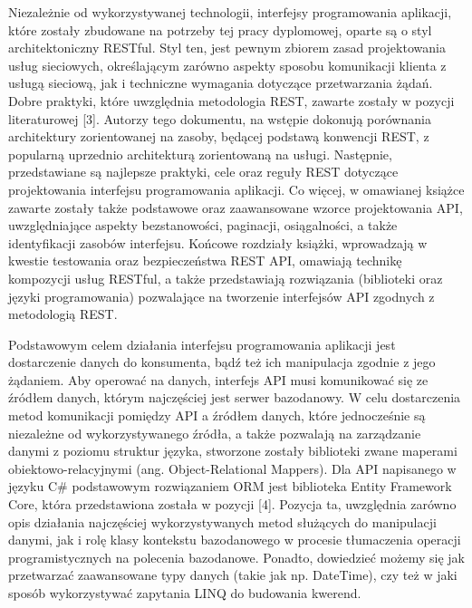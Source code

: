 Niezależnie od wykorzystywanej technologii, interfejsy programowania aplikacji, które zostały zbudowane na potrzeby tej pracy dyplomowej, oparte są o styl architektoniczny RESTful. Styl ten, jest pewnym zbiorem zasad projektowania usług sieciowych, określającym zarówno aspekty sposobu komunikacji klienta z usługą sieciową, jak i techniczne wymagania dotyczące przetwarzania żądań. Dobre praktyki, które uwzględnia metodologia REST, zawarte zostały w pozycji literaturowej [3]. Autorzy tego dokumentu, na wstępie dokonują porównania architektury zorientowanej na zasoby, będącej podstawą konwencji REST, z popularną uprzednio architekturą zorientowaną na usługi. Następnie, przedstawiane są najlepsze praktyki, cele oraz reguły REST dotyczące projektowania interfejsu programowania aplikacji. Co więcej, w omawianej książce zawarte zostały także podstawowe oraz zaawansowane wzorce projektowania API, uwzględniające aspekty bezstanowości, paginacji, osiągalności, a także identyfikacji zasobów interfejsu. Końcowe rozdziały książki, wprowadzają w kwestie testowania oraz bezpieczeństwa REST API, omawiają technikę kompozycji usług RESTful, a także przedstawiają rozwiązania (biblioteki oraz języki programowania) pozwalające na tworzenie interfejsów API zgodnych z metodologią REST.

Podstawowym celem działania interfejsu programowania aplikacji jest dostarczenie danych do konsumenta, bądź też ich manipulacja zgodnie z jego żądaniem. Aby operować na danych, interfejs API musi komunikować się ze źródłem danych, którym najczęściej jest serwer bazodanowy. W celu dostarczenia metod komunikacji pomiędzy API a źródłem danych, które jednocześnie są niezależne od wykorzystywanego źródła, a także pozwalają na zarządzanie danymi z poziomu struktur języka, stworzone zostały biblioteki zwane maperami obiektowo-relacyjnymi (ang. Object-Relational Mappers). Dla API napisanego w języku C\# podstawowym rozwiązaniem ORM jest biblioteka Entity Framework Core, która przedstawiona została w pozycji [4]. Pozycja ta, uwzględnia zarówno opis działania najczęściej wykorzystywanych metod służących do manipulacji danymi, jak i rolę klasy kontekstu bazodanowego w procesie tłumaczenia operacji programistycznych na polecenia bazodanowe. Ponadto, dowiedzieć możemy się jak przetwarzać zaawansowane typy danych (takie jak np. DateTime), czy też w jaki sposób wykorzystywać zapytania LINQ do budowania kwerend.

